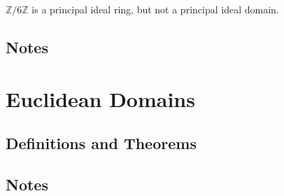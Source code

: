 \begin{exmbox}
    \begin{example}
        \(\mathbb{Z}/6\mathbb{Z}\) is a principal ideal ring, but not a principal ideal domain.
    \end{example}
\end{exmbox}

\subsection*{Notes}

\newpage
\section{Euclidean Domains}
\subsection*{Definitions and Theorems}
\subsection*{Notes}